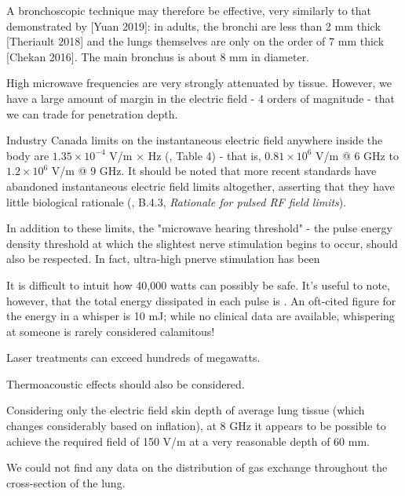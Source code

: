\documentclass[paper.tex]{subfiles}
\begin{document}
A bronchoscopic technique may therefore be effective, very similarly to that demonstrated by [Yuan 2019]: in adults, the bronchi are less than 2 mm thick [Theriault 2018] and the lungs themselves are only on the order of 7 mm thick [Chekan 2016]. The main bronchus is about 8 mm in diameter.

High microwave frequencies are very strongly attenuated by tissue. However, we have a large amount of margin in the electric field - 4 orders of magnitude - that we can trade for penetration depth.

Industry Canada limits on the instantaneous electric field anywhere inside the body are $1.35 \times 10^{-4}$ V/m $\times$ Hz (\cite{RSS1022015}, Table 4) - that is, $0.81 \times 10^6$ V/m @ 6 GHz to $1.2 \times 10^6$ V/m @ 9 GHz. It should be noted that more recent standards have abandoned instantaneous electric field limits altogether, asserting that they have little biological rationale (\cite{C95}, B.4.3, {\it Rationale for pulsed RF field limits}).\footnotemark

In addition to these limits, the "microwave hearing threshold" - the pulse energy density threshold at which the slightest nerve stimulation begins to occur, should also be respected. In fact, ultra-high pnerve stimulation has been 

It is difficult to intuit how 40,000 watts can possibly be safe. It's useful to note, however, that the total energy dissipated in each pulse is . An oft-cited figure for the energy in a whisper is 10 mJ; while no clinical data are available, whispering at someone is rarely considered calamitous\citationneeded!
 

Laser treatments can exceed hundreds of megawatts.
 
 
 Thermoacoustic effects should also be considered.
 



Considering only the electric field skin depth\footnotemark\cite{Safety2001}\cite{Physical1982} of average lung tissue\cite{gabriel1996compilation}\cite{Dielectricb}\cite{Dielectric}\cite{Tissue2018} (which changes considerably based on inflation), at 8 GHz it appears to be possible to achieve the required field of 150 V/m at a very reasonable depth of 60 mm. 

We could not find any data on the distribution of gas exchange throughout the cross-section of the lung.
\end{document}
